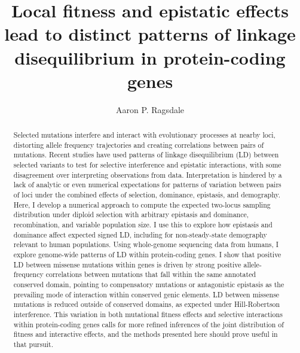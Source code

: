 \documentclass[]{article}
\begin{document}
\title{Local fitness and epistatic effects lead to distinct patterns of linkage disequilibrium in protein-coding genes}
\author[]{Aaron P. Ragsdale}
\maketitle


\begin{abstract}

Selected mutations interfere and interact with evolutionary processes at nearby
loci, distorting allele frequency trajectories and creating correlations
between pairs of mutations. Recent studies have used patterns of linkage
disequilibrium (LD) between selected variants to test for selective
interference and epistatic interactions, with some disagreement over
interpreting observations from data. Interpretation is hindered by a lack of
analytic or even numerical expectations for patterns of variation between pairs
of loci under the combined effects of selection, dominance, epistasis, and
demography. Here, I develop a numerical approach to compute the expected
two-locus sampling distribution under diploid selection with arbitrary
epistasis and dominance, recombination, and variable population size. I use
this to explore how epistasis and dominance affect expected signed LD,
including for non-steady-state demography relevant to human populations. Using
whole-genome sequencing data from humans, I explore genome-wide patterns of LD
within protein-coding genes. I show that positive LD between missense mutations
within genes is driven by strong positive allele-frequency correlations between
mutations that fall within the same annotated conserved domain, pointing to
compensatory mutations or antagonistic epistasis as the prevailing mode of
interaction within conserved genic elements. LD between missense mutations is
reduced outside of conserved domains, as expected under Hill-Robertson
interference. This variation in both mutational fitness effects and selective
interactions within protein-coding genes calls for more refined inferences of
the joint distribution of fitness and interactive effects, and the methods
presented here should prove useful in that pursuit.

\end{abstract}
\end{document}
